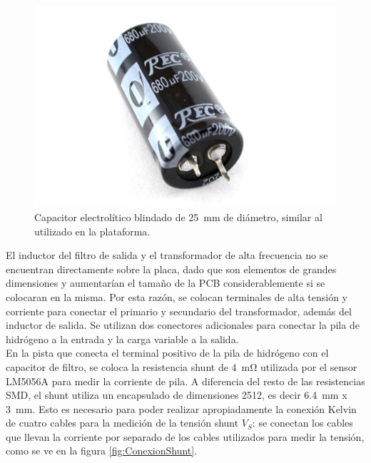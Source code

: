 \begin{figure}[h]
    \centering
    \includegraphics[scale=0.3]{Imagenes/Capacitor Blindado.jpg}
    \caption{Capacitor electrolítico blindado de \SI[]{25}[]{\milli\metre} de diámetro, similar al utilizado en la plataforma.}
    \label{fig:CapFiltro}
\end{figure}

El inductor del filtro de salida y el transformador de alta frecuencia no se encuentran directamente sobre la placa, dado que son elementos de grandes dimensiones y aumentarían el tamaño de la PCB considerablemente si se colocaran en la misma. Por esta razón, se colocan terminales de alta tensión y corriente para conectar el primario y secundario del transformador, además del inductor de salida. Se utilizan dos conectores adicionales para conectar la pila de hidrógeno a la entrada y la carga variable a la salida.\\

En la pista que conecta el terminal positivo de la pila de hidrógeno con el capacitor de filtro, se coloca la resistencia shunt de \SI[]{4}[]{\milli\ohm} utilizada por el sensor LM5056A para medir la corriente de pila. A diferencia del resto de las resistencias SMD, el shunt utiliza un encapsulado de dimensiones 2512, es decir \SI[]{6.4}[]{\milli\metre} x \SI[]{3}[]{\milli\metre}. Esto es necesario para poder realizar apropiadamente la conexión Kelvin de cuatro cables para la medición de la tensión shunt $V_S$: se conectan los cables que llevan la corriente por separado de los cables utilizados para medir la tensión, como se ve en la figura \ref{fig:ConexionShunt}.\\

